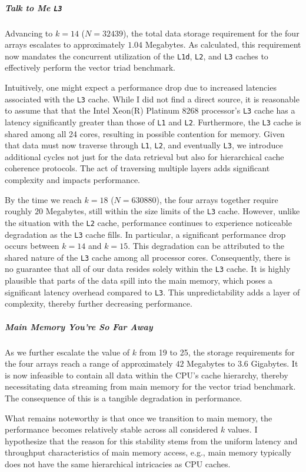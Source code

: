 \documentclass{article}
\begin{document}
\subparagraph*{Talk to Me \texttt{L3}} Advancing to \( k = 14 \) (\( N = 32439 \)), the total data storage requirement for the four arrays escalates to approximately \( 1.04 \) Megabytes. As calculated, this requirement now mandates the concurrent utilization of the \texttt{L1d}, \texttt{L2}, and \texttt{L3} caches to effectively perform the vector triad benchmark.

Intuitively, one might expect a performance drop due to increased latencies associated with the \texttt{L3} cache. While I did not find a direct source, it is reasonable to assume that that the Intel Xeon(R) Platinum 8268 processor's \texttt{L3} cache has a latency significantly greater than those of \texttt{L1} and \texttt{L2}. Furthermore, the \texttt{L3} cache is shared among all 24 cores, resulting in possible contention for memory. 
Given that data must now traverse through \texttt{L1}, \texttt{L2}, and eventually \texttt{L3}, we introduce additional cycles not just for the data retrieval but also for hierarchical cache coherence protocols. The act of traversing multiple layers adds significant complexity and impacts performance.

By the time we reach \( k = 18 \) (\( N = 630880 \)), the four arrays together require roughly \( 20 \) Megabytes, still within the size limits of the \texttt{L3} cache. However, unlike the situation with the \texttt{L2} cache, performance continues to experience noticeable degradation as the \texttt{L3} cache fills. In particular, a significant performance drop occurs between \( k = 14 \) and \( k = 15 \). This degradation can be attributed to the shared nature of the \texttt{L3} cache among all processor cores. Consequently, there is no guarantee that all of our data resides solely within the \texttt{L3} cache. It is highly plausible that parts of the data spill into the main memory, which poses a significant latency overhead compared to \texttt{L3}. This unpredictability adds a layer of complexity, thereby further decreasing performance.

\subparagraph*{Main Memory You're So Far Away} 
As we further escalate the value of \( k \) from 19 to 25, the storage requirements for the four arrays reach a range of approximately \( 42 \) Megabytes to \( 3.6 \) Gigabytes.
It is now infeasible to contain all data within the CPU's cache hierarchy, thereby necessitating data streaming from main memory for the vector triad benchmark. The consequence of this is a tangible degradation in performance. 

What remains noteworthy is that once we transition to main memory, the performance becomes relatively stable across all considered \( k \) values. I hypothesize that the reason for this stability stems from the uniform latency and throughput characteristics of main memory access, e.g., main memory typically does not have the same hierarchical intricacies as CPU caches. 
\end{document}

